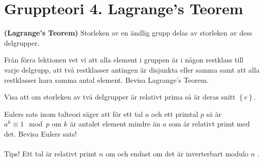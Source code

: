 \documentclass[11pt,fleqn]{book} %
\begin{document}
  \renewcommand*\rmdefault{ppl}\normalfont\upshape

\chapter{Gruppteori 4. Lagrange's Teorem}
\large
\thispagestyle{empty}

\begin{theoremeT} \textbf{(Lagrange's Teorem)} Storleken av en ändlig grupp delas av storleken av dess delgrupper.
\end{theoremeT} %

\begin{problem}
  Från förra lektionen vet vi att alla element i gruppen är i någon restklass till varje delgrupp, att två restklasser antingen är disjunkta eller samma samt att alla restklasser hara samma antal element. Bevisa Lagrange's Teorem.
\end{problem}

\begin{problem}
  Visa att om storleken av två delgrupper är relativt prima så är deras snitt \(\left\{e\right\}\).
\end{problem}

\begin{problem}
  Eulers sats inom talteori säger att för ett tal \(a\) och ett primtal \(p\) så är
  \(
    a^k \equiv 1 \mod p
  \)
  om \(k\) är antalet element mindre än \(a\) som är relativt primt med det. Bevisa Eulers sats!
  \\ \\
  Tips! Ett tal är relativt primt \(n\) om och endast om det är inverterbart modulo \(n\) . 
\end{problem}
\end{document}
